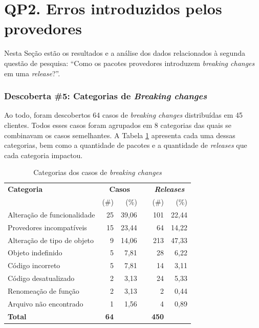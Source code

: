 \section{QP2. Erros introduzidos pelos provedores}
\label{sec:qp2:results}

Nesta Seção estão os resultados e a análise dos dados relacionados à segunda questão de pesquisa: ``Como os pacotes provedores introduzem \textit{breaking changes} em uma \textit{release}?''.

\subsubsection{Descoberta \#5: Categorias de \textit{Breaking changes}}

Ao todo, foram descobertos 64 casos de \textit{breaking changes} distribuídas em 45 clientes. Todos esses casos foram agrupados em 8 categorias das quais se combinavam os casos semelhantes. A Tabela \ref{tab:bc_category} apresenta cada uma dessas categorias, bem como a quantidade de pacotes e a quantidade de \textit{releases} que cada categoria impactou.

\begin{table}\centering
	\begin{tabular}{lrrrrr} \toprule
		\textbf{Categoria} & \multicolumn{2}{c}{\textbf{Casos}} & \phantom{ab} & \multicolumn{2}{c}{\textit{\textbf{Releases}}}
		\\
		\cmidrule{2-3} \cmidrule{5-6}
		& (\#) & (\%) && (\#) & (\%) \\ \midrule
		Alteração de funcionalidade  & 25              & 39,06 && 101                         & 22,44 \\
		Provedores incompatíveis     & 15              & 23,44 && 64                          & 14,22 \\
		Alteração de tipo de objeto  & 9               & 14,06 && 213                         & 47,33 \\
		Objeto indefinido            & 5               & 7,81  && 28                          & 6,22 \\
		Código incorreto             & 5               & 7,81  && 14                          & 3,11  \\
		Código desatualizado         & 2               & 3,13  && 24                          & 5,33 \\
		Renomeação de função         & 2               & 3,13  && 2                           & 0,44  \\
		Arquivo não encontrado       & 1               & 1,56  && 4                           & 0,89  \\ \hline
		\textbf{Total}               & \textbf{64}     &       && \textbf{450}              &       \\
		\bottomrule
	\end{tabular}
    \caption{Categorias dos casos de \textit{breaking changes}}
    \label{tab:bc_category}
\end{table}

